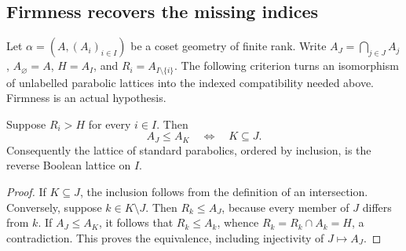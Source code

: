 \subsection{Firmness recovers the missing indices}


Let $\alpha=(A,(A_i)_{i\in I})$ be a coset geometry of finite rank.
Write $A_J=\bigcap_{j\in J}A_j$, $A_\varnothing=A$,
$H=A_I$, and $R_i=A_{I\setminus\{i\}}$.
The following criterion turns an isomorphism of unlabelled parabolic lattices into the indexed compatibility needed above. Firmness is an actual hypothesis.

\begin{lemma}\label{I-lem:boolean}
Suppose $R_i>H$ for every $i\in I$. Then
\[
 A_J\leq A_K\quad\Longleftrightarrow\quad K\subseteq J.
\]
Consequently the lattice of standard parabolics, ordered by inclusion,
is the reverse Boolean lattice on $I$.
\end{lemma}
\begin{proof}
If $K\subseteq J$, the inclusion follows from the definition of an
intersection. Conversely, suppose $k\in K\setminus J$. Then
$R_k\leq A_J$, because every member of $J$ differs from $k$.
If $A_J\leq A_K$, it follows that $R_k\leq A_k$, whence
$R_k=R_k\cap A_k=H$, a contradiction. This proves the equivalence,
including injectivity of $J\mapsto A_J$.
\end{proof}

